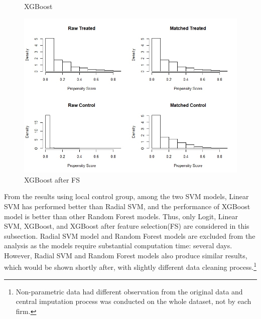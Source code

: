 \documentclass[11pt,a4paper,oneside]{article}
\begin{document}
\begin{figure}[!t]
  \caption{XGBoost}\label{fig:histogram3}
\endminipage
{}
  \includegraphics[width=\linewidth]{Figures/global_xgb_non_para_hist.jpeg}
  \caption{XGBoost after FS}\label{fig:histogram_global4}
\endminipage
\end{figure}

From the results using local control group, among the two SVM models, Linear SVM has performed better than Radial SVM, and the performance of XGBoost model is better than other Random Forest models. Thus, only Logit, Linear SVM, XGBoost, and XGBoost after feature selection(FS) are considered in this subsection. Radial SVM model and Random Forest models are excluded from the analysis as the models require substantial computation time: several days. However, Radial SVM and Random Forest models also produce similar results, which would be shown shortly after, with slightly different data cleaning process.\footnote{Non-parametric data had different observation from the original data and central imputation process was conducted on the whole dataset, not by each firm.} 
\end{document}
